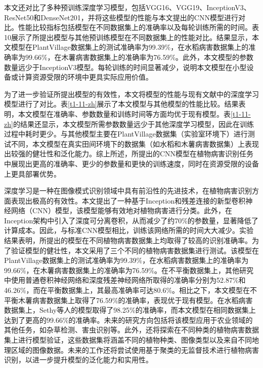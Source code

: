 
本文还对比了多种预训练深度学习模型，包括VGG16、VGG19、InceptionV3、ResNet50和DenseNet201，并将这些模型的性能与本文提出的CNN模型进行对比。性能比较指标包括模型在不同数据集上的准确率以及每轮训练所需的时间。表10展示了所提出模型与其他预训练模型在不同数据集上的性能对比。结果显示，本文模型在PlantVillage数据集上的测试准确率为99.39\%，在水稻病害数据集上的准确率为99.66\%，在木薯病害数据集上的准确率为76.59\%。此外，本文模型的参数数量远少于InceptionV3模型。每轮训练的时间显著减少，说明本文模型在小型设备或计算资源受限的环境中更具实际应用价值。


为了进一步验证所提出模型的有效性，本文将模型的性能与现有文献中的深度学习模型进行了对比。表\ref{t1-11-zh}展示了本文模型与其他模型的性能比较。结果表明，本文模型在准确率、参数数量和训练时间等方面均优于现有模型。表\ref{t1-11-zh}的结果还显示，本文模型所需参数数量远少于其他深度学习模型，因此在训练过程中耗时更少。与其他模型主要在PlantVillage数据集（实验室环境下）进行测试不同，本文模型在真实田间环境下的数据集（如水稻和木薯病害数据集）上表现出较强的健壮性和泛化能力。综上所述，所提出的CNN模型在植物病害识别任务中展现出更高的准确率、更少的参数量和更快的训练速度，同时在资源受限的设备上更具部署优势。

	深度学习是一种在图像模式识别领域中具有前沿性的先进技术，在植物病害识别方面表现出极高的有效性。本文提出了一种基于Inception和残差连接的新型卷积神经网络（CNN）模型，该模型能够有效地对植物病害进行分类。此外，在Inception架构中引入了深度可分离卷积，从而减少了约70\%的参数量，显著降低了计算成本。因此，与标准CNN模型相比，训练该网络所需的时间大大减少。实验结果表明，所提出的模型在不同植物病害数据集上均取得了较高的识别准确率。为了验证模型的健壮性，本文采用了三个不同的植物病害数据集进行测试。该模型在PlantVillage数据集上的测试准确率为99.39\%，在水稻病害数据集上的准确率为99.66\%，在木薯病害数据集上的准确率为76.59\%。在不平衡数据集上，其他研究中使用普通卷积神经网络和深度残差神经网络所取得的准确率分别为52.87\%和46.26\%，而在平衡数据集上，其最高准确率可达80.6\%。相比之下，本文模型在不平衡木薯病害数据集上取得了76.59\%的准确率，表现优于现有模型。在水稻病害数据集上，Sethy等人的模型取得了98.25\%的准确率，而本文模型在相同数据集上达到了更高的99.66\%的准确率。未来的研究方向包括将该模型应用于农业领域的其他任务，如杂草检测、害虫识别等。此外，还将探索在不同种类的植物病害数据集上进行模型验证，这些数据集将涵盖不同的植物种类、图像类型以及来自不同地理区域的图像数据。未来的工作还将尝试使用基于聚类的无监督技术进行植物病害识别，以进一步提升模型的泛化能力和实用性。
